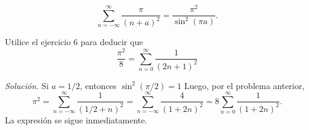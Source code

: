\documentclass[12pt]{article}
\newenvironment{problem}[2][Problema]{\begin{trivlist}
\item[\hskip \labelsep {\bfseries #1}\hskip \labelsep {\bfseries #2.}]}{\end{trivlist}}
\begin{document}
$$\sum_{n=-\infty}^\infty \frac{\pi}{(n+a)^2} = \frac{\pi^2}{\sin^2(\pi a)}. $$



\begin{problem}{7}
Utilice el ejercicio 6 para deducir que 
$$\frac{\pi^2}{8} = \sum_{n=0}^\infty \frac{1}{(2n + 1)^2} $$
\end{problem}
\textit{Solución.} Si $a=1/2$, entonces $\sin^2(\pi/2) = 1$ Luego, por el problema anterior,
$$\pi^2 = \sum_{n=-\infty}^\infty \frac{1}{(1/2 + n)^2} = \sum_{n=-\infty}^\infty \frac{4}{(1+ 2n)^2} = 8 \sum_{n=0}^\infty \frac{1}{(1 + 2n)^2}.$$
La expresión se sigue inmediatamente.
\printbibliography
\end{document}
